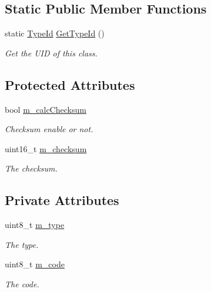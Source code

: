 \subsection*{Static Public Member Functions}
\begin{DoxyCompactItemize}
\item 
static \hyperlink{classns3_1_1TypeId}{Type\+Id} \hyperlink{classns3_1_1Icmpv6Header_a6936e330bbc3b4a8c34a6465a9729b61}{Get\+Type\+Id} ()
\begin{DoxyCompactList}\small\item\em Get the U\+ID of this class. \end{DoxyCompactList}\end{DoxyCompactItemize}
\subsection*{Protected Attributes}
\begin{DoxyCompactItemize}
\item 
bool \hyperlink{classns3_1_1Icmpv6Header_afdfd2dc6e28e0504e02c741d9585ccf9}{m\+\_\+calc\+Checksum}
\begin{DoxyCompactList}\small\item\em Checksum enable or not. \end{DoxyCompactList}\item 
uint16\+\_\+t \hyperlink{classns3_1_1Icmpv6Header_a6fe65b5998d91492bf6c1e13c8a0f29c}{m\+\_\+checksum}
\begin{DoxyCompactList}\small\item\em The checksum. \end{DoxyCompactList}\end{DoxyCompactItemize}
\subsection*{Private Attributes}
\begin{DoxyCompactItemize}
\item 
uint8\+\_\+t \hyperlink{classns3_1_1Icmpv6Header_ab8ff041725f233554ea52c49a29ee1a9}{m\+\_\+type}
\begin{DoxyCompactList}\small\item\em The type. \end{DoxyCompactList}\item 
uint8\+\_\+t \hyperlink{classns3_1_1Icmpv6Header_a4f0268e1df07589e9fb7da198592fdf9}{m\+\_\+code}
\begin{DoxyCompactList}\small\item\em The code. \end{DoxyCompactList}\end{DoxyCompactItemize}
